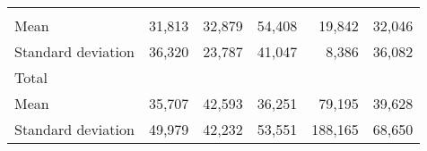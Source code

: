 \begin{tabular}{llllll}
  \multicolumn{1}{r}{} &
  \multicolumn{1}{r}{} &
  \multicolumn{1}{r}{} &
  \multicolumn{1}{r}{} \\
\multicolumn{1}{l}{\hspace{4em}Mean} &
  \multicolumn{1}{|r}{31,813} &
  \multicolumn{1}{r}{32,879} &
  \multicolumn{1}{r}{54,408} &
  \multicolumn{1}{r}{19,842} &
  \multicolumn{1}{r}{32,046} \\
\multicolumn{1}{l}{\hspace{4em}Standard deviation} &
  \multicolumn{1}{|r}{36,320} &
  \multicolumn{1}{r}{23,787} &
  \multicolumn{1}{r}{41,047} &
  \multicolumn{1}{r}{8,386} &
  \multicolumn{1}{r}{36,082} \\
\multicolumn{1}{l}{\hspace{3em}Total} &
  \multicolumn{1}{|r}{} &
  \multicolumn{1}{r}{} &
  \multicolumn{1}{r}{} &
  \multicolumn{1}{r}{} &
  \multicolumn{1}{r}{} \\
\multicolumn{1}{l}{\hspace{4em}Mean} &
  \multicolumn{1}{|r}{35,707} &
  \multicolumn{1}{r}{42,593} &
  \multicolumn{1}{r}{36,251} &
  \multicolumn{1}{r}{79,195} &
  \multicolumn{1}{r}{39,628} \\
\multicolumn{1}{l}{\hspace{4em}Standard deviation} &
  \multicolumn{1}{|r}{49,979} &
  \multicolumn{1}{r}{42,232} &
  \multicolumn{1}{r}{53,551} &
  \multicolumn{1}{r}{188,165} &
  \multicolumn{1}{r}{68,650} \\
\cline{1-6}
\end{tabular}

